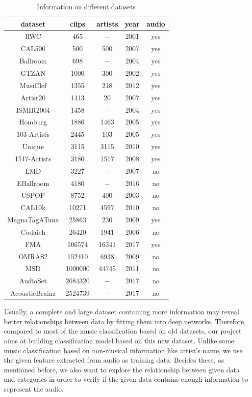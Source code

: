 \documentclass{article}
\begin{document}
\begin{table}[h!]
\centering
\begin{tabular}{*{5}{c}} \hline
dataset & clips & artists & year & audio \\ \hline
RWC & 465 & $-$ & 2001 & yes \\
CAL500 & 500 & 500 & 2007 & yes \\
Ballroom&  698& $-$ & 2004 & yes \\
GTZAN&  1000& 300 & 2002 & yes \\
MusiClef&  1355&  218 & 2012 & yes \\
Artist20&  1413& 20 &  2007&  yes \\
ISMIR2004&  1458 &  $-$ & 2004 & yes  \\
Homburg& 1886 & 1463 & 2005 & yes \\
103-Artists & 2445 & 103 & 2005 & yes \\  
Unique& 3115 & 3115 & 2010 & yes \\
1517-Artists& 3180 & 1517 & 2008 & yes \\
LMD& 3227 & $-$ & 2007 & no \\
EBallroom& 4180 & $-$ & 2016 & no\\ 
USPOP&8752  & 400 & 2003 & no \\
CAL10k& 10271 & 4597 & 2010 & no \\
MagnaTagATune& 25863 & 230 & 2009 & yes \\
Codaich& 26420 & 1941 & 2006 & no \\
FMA& 106574 & 16341 & 2017 & yes \\
OMRAS2 & 152410 & 6938 & 2009 & no \\
MSD& 1000000 & 44745 & 2011 & no \\
AudioSet& 2084320 & $-$ & 2017 & no \\
AcousticBrainz& 2524739 & $-$ & 2017 & no \\ 
\end{tabular}
\caption{Information on different datasets \citep{fma}}
\label{table:1}
\end{table}

Usually, a complete and large dataset containing more information may reveal better relationships between data by fitting them into deep networks. Therefore, compared to most of the music classification based on old datasets, our project aims at building classification model based on this new dataset. Unlike some music classification based on non-musical information like artist's name, we use the given feature extracted from audio as training data. Besides these, as mentioned before, we also want to explore the relationship between given data and categories in order to verify if the given data contains enough information to represent the audio. 
\end{document}
